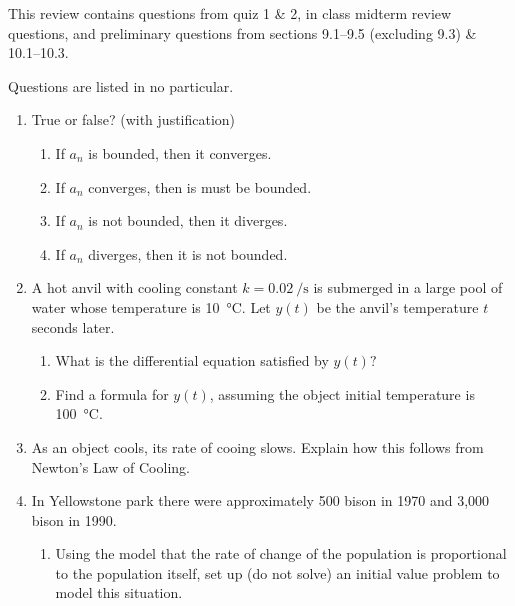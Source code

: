 \documentclass{nosvagor-notes}
\begin{document}
This review contains questions from quiz 1 \& 2, in class midterm review questions,
and preliminary questions from sections 9.1--9.5 (excluding 9.3) \& 10.1--10.3.

Questions are listed in no particular.

\begin{enumerate}
  \item True or false? (with justification)
  \begin{enumerate}
    \item If \({a_n}\) is bounded, then it converges.
      \vspace{130pt}
    \item If \({a_n}\) converges, then is must be bounded.
      \vspace{130pt}
    \item If \({a_n}\) is not bounded, then it diverges.
      \vspace{130pt}
    \item If \({a_n}\) diverges, then it is not bounded.
      \vspace{130pt}
  \end{enumerate}

  \newpage

 \item A hot anvil with cooling constant \(k = \SI{0.02}{\per\second}\) is
   submerged in a large pool of water whose temperature is \SI{10}{\celsius}.
   Let \(y(t)\) be the anvil’s temperature \(t\) seconds later.
   \begin{enumerate}
     \item What is the differential equation satisfied by \(y(t)?\)
       \vspace{140pt}

     \item Find a formula for \(y(t)\), assuming the object initial temperature
       is \SI{100}{\celsius}.
       \vspace{180pt}
   \end{enumerate}

  \item As an object cools, its rate of cooing slows. Explain how this follows
    from Newton's Law of Cooling.

    \newpage

  \item In Yellowstone park there were approximately 500 bison in 1970 and
    3,000 bison in 1990.
    \begin{enumerate}
      \item Using the model that the rate of change of the population is
        proportional to the population itself, set up (do not solve) an initial
        value problem to model this situation.
        \vspace{140pt}


\end{enumerate}
\end{enumerate}
\end{document}
